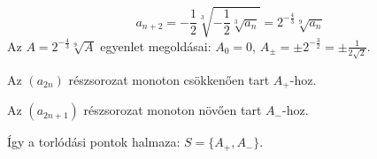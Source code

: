 \documentclass[11pt]{scrartcl}
\begin{document}
\[
	a_{n + 2}
	= -\frac{1}{2} \sqrt[3]{-\frac{1}{2} \sqrt[3]{a_n}}
	= 2^{-\frac{4}{3}} \sqrt[9]{a_n}
\]
Az $A = 2^{-\frac{4}{3}} \sqrt[9]{A}$ egyenlet megoldásai: $A_0 = 0$,
$A_\pm = \pm 2^{-\frac{3}{2}} = \pm \frac{1}{2\sqrt{2}}$.

Az $(a_{2n})$ részsorozat monoton csökkenően tart $A_+$-hoz.

Az $(a_{2n + 1})$ részsorozat monoton növően tart $A_-$-hoz.

Így a torlódási pontok halmaza: $S = \{A_+, A_-\}$.
\end{document}
